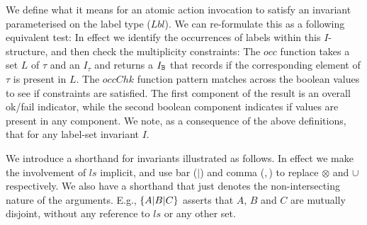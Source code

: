 We define what it means for an atomic action invocation
to satisfy an invariant parameterised on the label type ($Lbl$).
We can re-formulate this as a following equivalent test:
In effect we identify the occurrences of labels within this $I$-structure,
and then check the multiplicity constraints:
The $occ$ function takes a set $L$ of $\tau$ and an $I_\tau$ and returns a $I_{\mathbb{B}}$
that records if the corresponding element of $\tau$ is present in $L$.
The $occChk$ function pattern matches across the boolean values to see if
constraints are satisfied.
The first component of the result is an overall ok/fail indicator,
while the second boolean component indicates if values are present
in any component.
We note, as a consequence of the above definitions, that
for any label-set invariant $I$.

We introduce a shorthand for invariants illustrated as follows.
In effect we make the involvement of $ls$ implicit,
and use bar ($|$) and comma ($,$) to replace $\otimes$ and $\cup$ respectively.
We also have a shorthand that just denotes
the non-intersecting nature of the arguments.
E.g.,
$\{A|B|C\}$ asserts that $A$, $B$ and $C$ are mutually disjoint,
without any reference to $ls$ or any other set.


